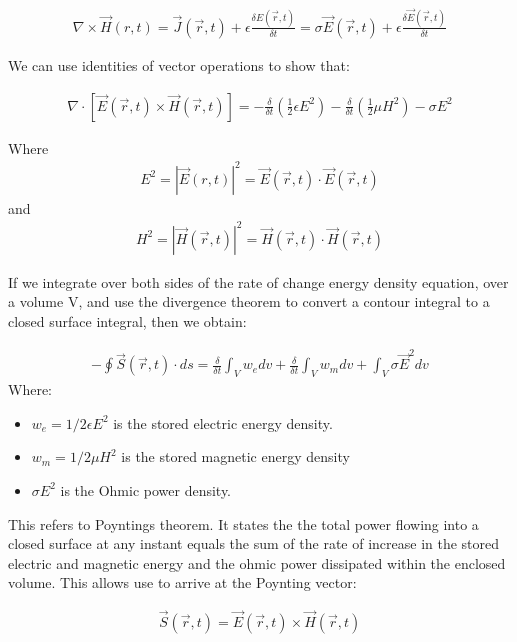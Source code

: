 \documentclass{book}
\begin{document}
\begin{align*}
	\nabla \times \vec{H}(r,t) = \vec{J}(\vec{r},t) + \epsilon \frac{\delta E(\vec{r}, t)}{\delta t} = \sigma \vec{E}(\vec{r}, t)+ \epsilon \frac{\delta \vec{E}(\vec{r}, t)}{\delta t}
\end{align*}

We can use identities of vector operations to show that:

\begin{align*}
	\nabla \cdot [\vec{E}(\vec{r},t) \times \vec{H}(\vec{r}, t)] = -\frac{\delta}{\delta t} (\frac{1}{2} \epsilon E^2) - \frac{\delta}{\delta t} (\frac{1}{2}\mu H^2) - \sigma E^2
\end{align*}

Where 
\begin{align*}
	E^2 = |\vec{E}(r,t)|^2 = \vec{E}(\vec{r}, t) \cdot \vec{E}(\vec{r}, t)
\end{align*}
and 
\begin{align*}
	H^2 = |\vec{H}(\vec{r}, t)|^2 = \vec{H}(\vec{r}, t) \cdot \vec{H} (\vec{r}, t)
\end{align*}

If we integrate over both sides of the rate of change energy density equation, over a volume V, and use the divergence theorem to convert a contour integral to a closed surface integral, then we obtain:

\begin{align*}
	-\oint\vec{S} (\vec{r}, t) \cdot ds = \frac{\delta}{\delta t} \int_{V} w_e dv + \frac{\delta}{\delta t} \int_{V}w_m dv + \int_{V}\sigma \vec{E}^2 dv
\end{align*}
Where:
\begin{itemize}
	\item $w_e = 1/2 \epsilon E^2$ is the stored electric energy density.
	\item $w_m = 1/2 \mu H^2$ is the stored magnetic energy density
	\item $\sigma E^2$ is the Ohmic power density. 
\end{itemize}
This refers to Poyntings theorem. It states the the total power flowing into a closed surface at any instant equals the sum of the rate of increase in the stored electric and magnetic energy and the ohmic power dissipated within the enclosed volume. This allows use to arrive at the Poynting vector:

\begin{align*}
	\vec{S}(\vec{r}, t) = \vec{E}(\vec{r}, t) \times \vec{H} (\vec{r}, t)
\end{align*}
\end{document}
